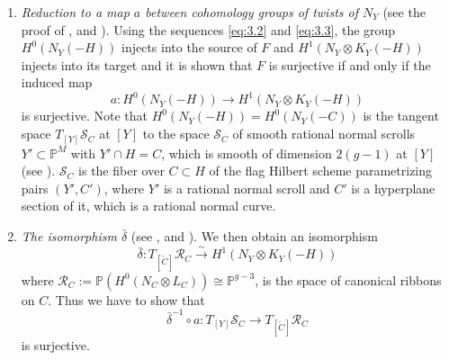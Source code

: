 \documentclass[11pt,twoside]{amsart}
\theoremstyle{plain}
\theoremstyle{definition}
\newcommand{\PP}{\mathbb{P}}
\newcommand{\PM}{\mathbb{P}^M}
\newcommand{\Hom}{\operatorname{Hom}}
\newcommand{\id}{\mathrm{id}}
\newcommand{\Yt}{\widetilde{Y}}
\newcommand{\Ct}{\widetilde{C}}
\newcommand{\NY}{N_{Y}}
\newcommand{\SC}{\mathcal{S}_C}
\newcommand{\RC}{\mathcal{R}_C}
\newcommand{\Dd}{D}
\begin{document}
\begin{enumerate}
    \item[(1)] \emph{Reduction to a map $a$ between cohomology groups of twists of $\NY$} (see the proof of ,  and ). Using the sequences \eqref{eq:3.2} and \eqref{eq:3.3}, the group $H^0(\NY(-H))$ injects into the source of $F$ and $H^1(\NY\otimes K_Y(-H))$ injects into its target and it is shown that
    $F$ is surjective if and only if the induced map
    \[
    a\colon H^0(\NY(-H)) \longrightarrow H^1(\NY\otimes K_Y(-H))
    \]
    is surjective. Note that $H^0(\NY(-H)) = H^0(\NY(-C))$ is the tangent space $T_{[Y]}\SC$ at $[Y]$ to the space  $\SC$ of smooth rational normal scrolls $Y' \subset \PM$ with $Y' \cap H = C$, which is smooth of dimension $2(g-1)$ at $[Y]$ (see ). $\mathcal{S}_C$ is the fiber over $C \subset H$ of the flag Hilbert scheme parametrizing pairs $(Y',C')$, where $Y'$ is a rational normal scroll and $C'$ is a hyperplane section of it, which is a rational normal curve. 

    \item[(2)] \emph{The isomorphism $\bar{\delta}$} (see ,  and ). 
    We then obtain an isomorphism
    \[
    \bar\delta\colon T_{[\Ct]}\RC \xrightarrow{\ \sim\ } H^1(\NY\otimes K_Y(-H))
    \]
    where $\RC := \PP(H^0(N_C\otimes L_C)) \cong \PP^{g-3}$, 
    is the space of canonical ribbons on $C$.
    Thus we have to show that
    \[
    \bar\delta^{-1}\circ a\colon T_{[Y]}\SC \longrightarrow T_{[\Ct]}\RC
    \]
    is surjective.


\end{enumerate}
\end{document}
